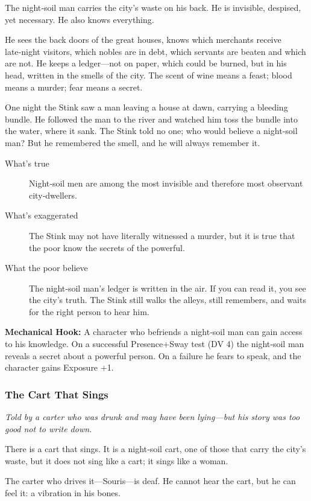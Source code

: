 \documentclass[11pt]{article}
\begin{document}
The night‑soil man carries the city’s waste on his back. He is invisible, despised, yet necessary. He also knows everything.

He sees the back doors of the great houses, knows which merchants receive late‑night visitors, which nobles are in debt, which servants are beaten and which are not. He keeps a ledger—not on paper, which could be burned, but in his head, written in the smells of the city. The scent of wine means a feast; blood means a murder; fear means a secret.

One night the Stink saw a man leaving a house at dawn, carrying a bleeding bundle. He followed the man to the river and watched him toss the bundle into the water, where it sank. The Stink told no one; who would believe a night‑soil man? But he remembered the smell, and he will always remember it.

\begin{description}
\item[What's true] Night‑soil men are among the most invisible and therefore most observant city‑dwellers.
\item[What's exaggerated] The Stink may not have literally witnessed a murder, but it is true that the poor know the secrets of the powerful.
\item[What the poor believe] The night‑soil man’s ledger is written in the air. If you can read it, you see the city’s truth. The Stink still walks the alleys, still remembers, and waits for the right person to hear him.
\end{description}

\textbf{Mechanical Hook:} A character who befriends a night‑soil man can gain access to his knowledge. On a successful Presence+Sway test (DV 4) the night‑soil man reveals a secret about a powerful person. On a failure he fears to speak, and the character gains Exposure +1.

\subsubsection{The Cart That Sings}
\textit{Told by a carter who was drunk and may have been lying—but his story was too good not to write down.}

There is a cart that sings. It is a night‑soil cart, one of those that carry the city’s waste, but it does not sing like a cart; it sings like a woman.

The carter who drives it—Souris—is deaf. He cannot hear the cart, but he can feel it: a vibration in his bones.
\end{document}
